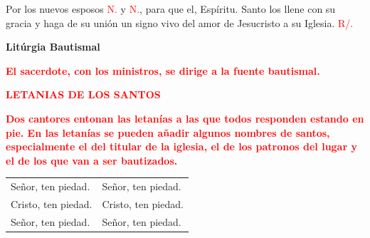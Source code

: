 \documentclass[12pt, letterpaper]{report}
\begin{document}
\Large Por los nuevos esposos \textcolor{red}{N.} y \textcolor{red}{N.}, para que el, Esp\'iritu. Santo los llene con su gracia y haga de su uni\'on un signo vivo del amor de Jesucristo a su Iglesia. \hspace{1cm} \textcolor{red}{R/.}

\newpage

\begin{center}
\Huge {\bfseries Lit\'urgia Bautismal}
\end{center}

\vspace{1cm}

\large {\bfseries \textcolor{red}{El sacerdote, con los ministros, se dirige a la fuente bautismal.}} \newline

\Large {\bfseries \textcolor{red}{LETANIAS DE LOS SANTOS}} \newline

\large {\bfseries \textcolor{red}{Dos cantores entonan las letan\'ias a las que todos responden estando en pie. En las letan\'ias se pueden a\~nadir algunos nombres de santos, especialmente el del titular de la iglesia, el de los patronos del lugar y el de los que van a ser bautizados.}} \newline

\begin{tabular}{ll}
Se\~nor, ten piedad.& Se\~nor, ten piedad.\\
Cristo, ten piedad.& Cristo, ten piedad. \\
Se\~nor, ten piedad.& Se\~nor, ten piedad.
\end{tabular} \newline \\
\end{document}
